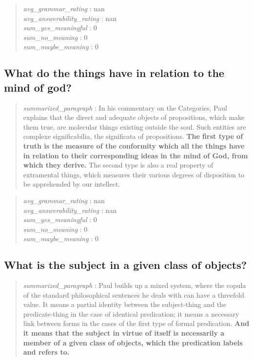 \begin{quote}
\emph{avg\_grammar\_rating} : nan\\
\emph{avg\_answerability\_rating} : nan\\
\emph{sum\_yes\_meaningful} : 0\\
\emph{sum\_no\_meaning} : 0\\
\emph{sum\_maybe\_meaning} : 0
\end{quote}

\hypertarget{what-do-the-things-have-in-relation-to-the-mind-of-god}{%
\subsection{What do the things have in relation to the mind of
god?}\label{what-do-the-things-have-in-relation-to-the-mind-of-god}}

\begin{quote}
\emph{summarized\_paragraph} : In his commentary on the Categories, Paul
explains that the direct and adequate objects of propositions, which
make them true, are molecular things existing outside the soul. Such
entities are complexe significabilia, the significata of propositions.
\textbf{The first type of truth is the measure of the conformity which
all the things have in relation to their corresponding ideas in the mind
of God, from which they derive.} The second type is also a real property
of extramental things, which measures their various degrees of
disposition to be apprehended by our intellect.
\end{quote}

\begin{quote}
\emph{avg\_grammar\_rating} : nan\\
\emph{avg\_answerability\_rating} : nan\\
\emph{sum\_yes\_meaningful} : 0\\
\emph{sum\_no\_meaning} : 0\\
\emph{sum\_maybe\_meaning} : 0
\end{quote}

\hypertarget{what-is-the-subject-in-a-given-class-of-objects}{%
\subsection{What is the subject in a given class of
objects?}\label{what-is-the-subject-in-a-given-class-of-objects}}

\begin{quote}
\emph{summarized\_paragraph} : Paul builds up a mixed system, where the
copula of the standard philosophical sentences he deals with can have a
threefold value. It means a partial identity between the subject-thing
and the predicate-thing in the case of identical predication; it means a
necessary link between forms in the cases of the first type of formal
predication. \textbf{And it means that the subject in virtue of itself
is necessarily a member of a given class of objects, which the
predication labels and refers to.}
\end{quote}

